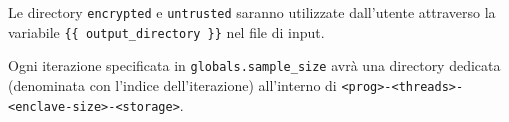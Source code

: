 \documentclass{article}
\begin{document}
Le directory \texttt{encrypted} e \texttt{untrusted} saranno utilizzate dall'utente attraverso la variabile \texttt{\{\{ output\_directory \}\}} nel file di input.

Ogni iterazione specificata in \texttt{globals.sample\_size} avrà una directory dedicata (denominata con l'indice dell'iterazione) all'interno di \texttt{<prog>-<threads>-<enclave-size>-<storage>}.

\clearpage
\pagestyle{plain}
\setcounter{page}{1}


\end{document}
